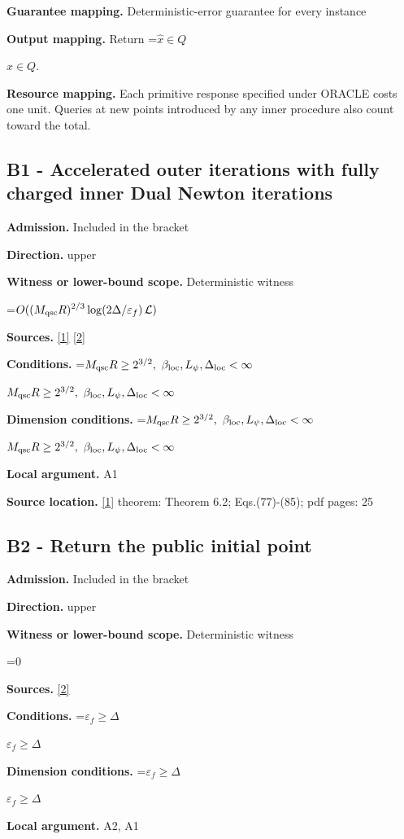 \documentclass[10pt,a4paper]{article}
\newcommand{\AtlasMath}[1]{\par\begingroup\centering\setbox0=\hbox{$\displaystyle #1$}\ifdim\wd0>1.4\linewidth\typeout{ATLAS WIDE FORMULA: \the\wd0}\fi\ifdim\wd0>\linewidth\resizebox{\linewidth}{!}{\box0}\else\box0\fi\par\endgroup}
\newcommand{\AtlasInlineMath}[1]{\begingroup\setbox0=\hbox{$#1$}\ifdim\wd0>.4\linewidth\endgroup\AtlasMath{#1}\else\endgroup$#1$\fi}
\begin{document}
\textbf{Guarantee mapping.} Deterministic-error guarantee for every instance

\textbf{Output mapping.} Return \AtlasInlineMath{\widehat{x}\in Q}.

\textbf{Resource mapping.} Each primitive response specified under ORACLE costs one unit. Queries at new points introduced by any inner procedure also count toward the total.

\subsection{B1 - Accelerated outer iterations with fully charged inner Dual Newton iterations}
\textbf{Admission.} Included in the bracket

\textbf{Direction.} upper

\textbf{Witness or lower-bound scope.} Deterministic witness

\AtlasMath{O((M_{\rm qsc}R)^{2/3}\log(2\Delta/\varepsilon_f)\,\mathcal{L})}
\textbf{Sources.} \href{https://arxiv.org/pdf/2308.14742v1}{[1]} \href{https://arxiv.org/html/2610.00345v1}{[2]}

\textbf{Conditions.} \AtlasInlineMath{M_{\rm qsc}R\ge2^{3/2},\ \beta_{\rm loc},L_\psi,\Delta_{\rm loc}<\infty}

\textbf{Dimension conditions.} \AtlasInlineMath{M_{\rm qsc}R\ge2^{3/2},\ \beta_{\rm loc},L_\psi,\Delta_{\rm loc}<\infty}

\textbf{Local argument.} A1

\textbf{Source location.} \href{https://arxiv.org/pdf/2308.14742v1}{[1]} theorem: Theorem 6.2; Eqs.(77)-(85); pdf pages: 25

\subsection{B2 - Return the public initial point}
\textbf{Admission.} Included in the bracket

\textbf{Direction.} upper

\textbf{Witness or lower-bound scope.} Deterministic witness

\AtlasMath{0}
\textbf{Sources.} \href{https://arxiv.org/html/2610.00345v1}{[2]}

\textbf{Conditions.} \AtlasInlineMath{\varepsilon_f\ge\Delta}

\textbf{Dimension conditions.} \AtlasInlineMath{\varepsilon_f\ge\Delta}

\textbf{Local argument.} A2, A1
\end{document}
